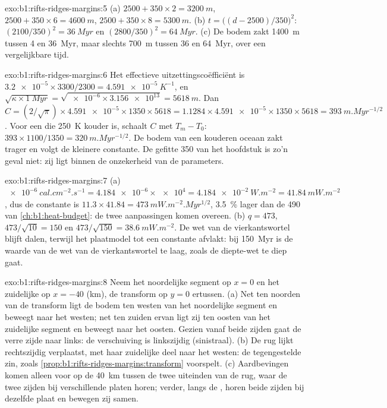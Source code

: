 \begin{solution}{exo:b1:rifts-ridges-margins:5}
(a) $2500 + 350\times2 = \qty{3200}{m}$, $2500 + 350\times6 = \qty{4600}{m}$,
$2500 + 350\times8 = \qty{5300}{m}$. (b) $t = \bigl((d - 2500)/350\bigr)^2$:
$(2100/350)^2 = \qty{36}{Myr}$ en $(2800/350)^2 = \qty{64}{Myr}$. (c) De bodem zakt
\qty{1400}{m} tussen 4 en \qty{36}{Myr}, maar slechts \qty{700}{m} tussen 36 en
\qty{64}{Myr}, over een vergelijkbare tijd.
\end{solution}

\begin{solution}{exo:b1:rifts-ridges-margins:6}
Het effectieve uitzettingscoëfficiënt is
$\num{3.2e-5}\times3300/2300 = \qty{4.591e-5}{K^{-1}}$, en
$\sqrt{\kappa\times\qty{1}{Myr}} = \sqrt{\num{e-6}\times\num{3.156e13}} =
\qty{5618}{m}$. Dan $C = (2/\sqrt\pi)\times\num{4.591e-5}\times1350\times5618 =
1.1284\times\num{4.591e-5}\times1350\times5618 = \qty{393}{m.Myr^{-1/2}}$. Voor een
 die \qty{250}{K} kouder is, schaalt $C$ met $T_m - T_0$:
$393\times1100/1350 = \qty{320}{m.Myr^{-1/2}}$. De bodem van een kouderen oceaan
zakt trager en volgt de kleinere constante. De gefitte \num{350} van het
hoofdstuk is zo'n geval niet: zij ligt binnen de onzekerheid van de parameters.
\end{solution}

\begin{solution}{exo:b1:rifts-ridges-margins:7}
(a) $\qty{e-6}{cal.cm^{-2}.s^{-1}} = \num{4.184e-6}\times\num{e4} =
\qty{4.184e-2}{W.m^{-2}} = \qty{41.84}{mW.m^{-2}}$, dus de constante is
$11.3\times41.84 = \qty{473}{mW.m^{-2}.Myr^{1/2}}$, \qty{3.5}{\percent} lager dan de
490 van \cref{ch:b1:heat-budget}: de twee aanpassingen komen overeen. (b) $q = 473$,
$473/\sqrt{10} = 150$ en $473/\sqrt{150} = \qty{38.6}{mW.m^{-2}}$. De wet van de
vierkantswortel blijft dalen, terwijl het plaatmodel tot een constante afvlakt: bij
\qty{150}{Myr} is de waarde van de wet van de vierkantswortel te laag, zoals de
diepte-wet te diep gaat.
\end{solution}

\begin{solution}{exo:b1:rifts-ridges-margins:8}
Neem het noordelijke segment op $x = 0$ en het zuidelijke op $x = -40$
(km), de transform op $y = 0$ ertussen. (a) Net ten noorden van de transform ligt
de bodem ten westen van het noordelijke segment en beweegt naar het westen; net
ten zuiden ervan ligt zij ten oosten van het zuidelijke segment en beweegt naar het
oosten. Gezien vanaf beide zijden gaat de verre zijde naar links: de verschuiving is
linkszijdig (sinistraal). (b) De rug lijkt rechtszijdig verplaatst, met haar
zuidelijke deel naar het westen: de tegengestelde zin, zoals
\cref{prop:b1:rifts-ridges-margins:transform} voorspelt. (c) Aardbevingen komen
alleen voor op de \qty{40}{km} tussen de twee uiteinden van de rug, waar de twee
zijden bij verschillende platen horen; verder, langs de , horen beide
zijden bij dezelfde plaat en bewegen zij samen.
\end{solution}

